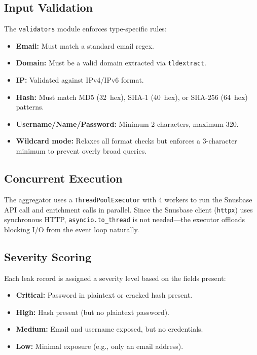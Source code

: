 \subsection{Input Validation}

The \texttt{validators} module enforces type-specific rules:

\begin{itemize}[nosep]
  \item \textbf{Email:} Must match a standard email regex.
  \item \textbf{Domain:} Must be a valid domain extracted via
        \texttt{tldextract}.
  \item \textbf{IP:} Validated against IPv4/IPv6 format.
  \item \textbf{Hash:} Must match MD5 (32~hex), SHA-1 (40~hex), or
        SHA-256 (64~hex) patterns.
  \item \textbf{Username/Name/Password:} Minimum 2 characters, maximum 320.
  \item \textbf{Wildcard mode:} Relaxes all format checks but enforces a
        3-character minimum to prevent overly broad queries.
\end{itemize}

\subsection{Concurrent Execution}

The aggregator uses a \texttt{ThreadPoolExecutor} with 4 workers to run the
Snusbase API call and enrichment calls in parallel. Since the Snusbase client
(\texttt{httpx}) uses synchronous HTTP, \texttt{asyncio.to\_thread} is not
needed---the executor offloads blocking I/O from the event loop naturally.

\subsection{Severity Scoring}

Each leak record is assigned a severity level based on the fields present:

\begin{itemize}[nosep]
  \item \textbf{Critical:} Password in plaintext or cracked hash present.
  \item \textbf{High:} Hash present (but no plaintext password).
  \item \textbf{Medium:} Email and username exposed, but no credentials.
  \item \textbf{Low:} Minimal exposure (e.g., only an email address).
\end{itemize}

